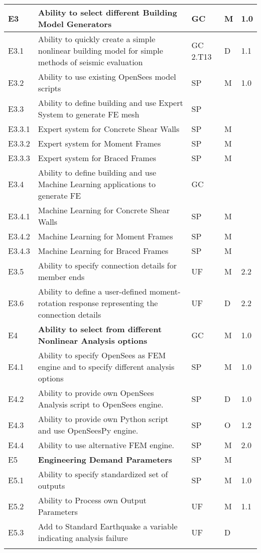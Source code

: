 \begin{longtable}{| p{} | p{} | p{} | p{} |  p{} |}
      
	E3 & \textbf{Ability to select different Building Model Generators} & GC & M & 1.0 \\ \hline
	E3.1 & Ability to quickly create a simple nonlinear building model for simple methods of seismic evaluation & GC 2.T13 & D & 1.1 \\ \hline
	E3.2 & Ability to use existing OpenSees model scripts & SP & M & 1.0 \\ \hline
	E3.3  & Ability to define building and use Expert System to generate FE mesh & SP & &  \\ \hline
	E3.3.1 & Expert system for Concrete Shear Walls & SP & M &  \\ \hline
	E3.3.2 & Expert system for Moment Frames & SP & M &  \\ \hline
	E3.3.3 & Expert system for  Braced Frames & SP & M &   \\ \hline
	E3.4 & Ability to define building and use Machine Learning applications to generate FE & GC &  &  \\ \hline
	E3.4.1 & Machine Learning for Concrete Shear Walls & SP & M &  \\ \hline
	E3.4.2 & Machine Learning for Moment Frames & SP & M &  \\ \hline
	E3.4.3 & Machine Learning for Braced Frames & SP & M &   \\ \hline
	E3.5 & Ability to specify connection details for member ends & UF & M & 2.2 \\ \hline
	E3.6 & Ability to define a user-defined moment-rotation response representing the connection details & UF & D & 2.2 \\  \hhline{=====}
	
	
	E4 & \textbf{Ability to select from different Nonlinear Analysis options} & GC & M & 1.0 \\ \hline
	E4.1 & Ability to specify OpenSees as FEM engine and to specify different analysis options & SP & M & 1.0 \\ \hline
	E4.2 & Ability to provide own OpenSees Analysis script to OpenSees engine. & SP & D & 1.0 \\ \hline
	E4.3 & Ability to provide own Python script and use OpenSeesPy engine. & SP & O & 1.2 \\ \hline
	E4.4 & Ability to use alternative FEM engine. & SP & M & 2.0 \\ \hhline{=====}

    E5 & \textbf{Engineering Demand Parameters} & SP & M &  \\ \hline
    E5.1 & Ability to specify standardized set of outputs & SP & M & 1.0  \\ \hline
    E5.2 & Ability to Process own Output Parameters & UF & M & 1.1  \\ \hline
    E5.3 & Add to Standard Earthquake a variable indicating analysis failure & UF & D &   \\ \hhline{=====}



\end{longtable}
